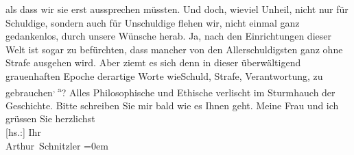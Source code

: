 \begin{ledgroupsized}[t]{13cm}
                    als dass wir sie erst aussprechen müssten. Und doch, wieviel Unheil, nicht nur
                    für Schuldige, sondern auch für Unschuldige flehen wir, nicht einmal ganz
                    gedankenlos, durch unsere Wünsche herab. Ja, nach den Einrichtungen dieser Welt
                    ist sogar zu befürchten, dass mancher von den Allerschuldigsten ganz ohne Strafe
                    ausgehen wird. Aber ziemt es sich \introOben{}denn\introOben{} in dieser
                    überwältigend grauenhaften Epoche derartige Worte \introOben{}wie\introOben{}{ }Schuld, Strafe, Verantwortung,
                    zu gebrauchen\substVorne{}\textsuperscript{, a}\substDazwischen{}? A\substHinten{}lles Philosophische und Ethische verlischt im Sturmhauch der
                    Geschichte.\pend
           \pstart
           Bitte schreiben Sie mir bald wie es Ihnen geht. Meine Frau und ich grüssen Sie herzlichst{\\[\baselineskip]}{[}hs.:{]} Ihr{\\[\baselineskip]}\spacefill\mbox{Arthur Schnitzler}\pend
           \leftskip=0em{}\endnumbering{}\end{ledgroupsized}  \newcommand{\dateiname}{L02199}\newcommand{\titel}{Arthur Schnitzler an Georg Brandes, 20. 10. 1914}\newcommand{\editorInnen}{Martin Anton Müller und Gerd-Hermann Susen}
      